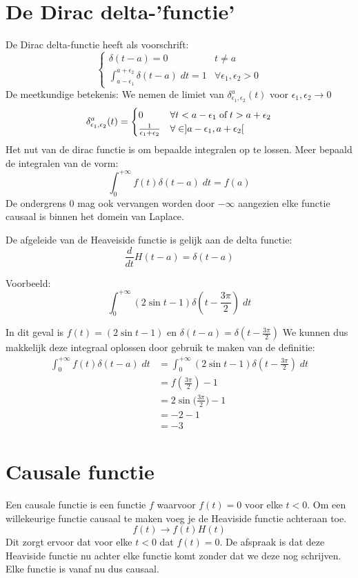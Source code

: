 \documentclass[12pt]{report}
\newcommand{\example}[2]{
      \hrulefill
      
      Voorbeeld: #1
      
      #2
      
      \hrulefill
}
\begin{document}
\section{De Dirac delta-'functie'}
De Dirac delta-functie heeft als voorschrift:
$$
  \begin{cases}
   \delta(t - a) = 0 & t \neq a \\
   \int_{a - \epsilon_1}^{a + \epsilon_2} \delta(t - a) \; dt = 1 & \forall \epsilon_1, \epsilon_2 > 0 
  \end{cases}
$$
De meetkundige betekenis: We nemen de limiet van $\delta^a_{\epsilon_1,\epsilon_2}(t)$ voor $\epsilon_1,\epsilon_2 \rightarrow 0$
$$\delta^a_{\epsilon_1,\epsilon_2}(t) = \begin{cases}
                                         0 & \forall t < a - \epsilon_1 \; \hbox{of} \; t > a + \epsilon_2 \\
                                         \frac{1}{\epsilon_1 + \epsilon_2} & \forall \in ]a - \epsilon_1, a + \epsilon_2[
                                        \end{cases}
$$
Het nut van de dirac functie is om bepaalde integralen op te lossen. Meer bepaald de integralen van de vorm:
$$\int_{0}^{+\infty} f(t) \delta(t- a)\;dt = f(a)$$
De ondergrens 0 mag ook vervangen worden door $-\infty$ aangezien elke functie causaal is binnen het domein van Laplace.

De afgeleide van de Heaveiside functie is gelijk aan de delta functie:
$$\frac{d}{dt}H(t-a) = \delta(t - a)$$
\example{$$\int_{0}^{+\infty} (2\sin t - 1) \delta(t - \frac{3\pi}{2}) \; dt$$}{
In dit geval is $f(t) = (2\sin t - 1)$ en $\delta(t - a) = \delta(t - \frac{3\pi}{2})$
We kunnen dus makkelijk deze integraal oplossen door gebruik te maken van de definitie:
\begin{equation*}
 \begin{split}
  \int_{0}^{+\infty} f(t) \delta(t- a)\;dt & = \int_{0}^{+\infty} (2\sin t - 1) \delta(t - \frac{3\pi}{2}) \; dt \\
                                           & = f(\frac{3\pi}{2}) - 1  \\
                                           & = 2\sin \bigg(\frac{3\pi}{2}\bigg) - 1 \\
                                           & = -2 - 1 \\
                                           & = - 3
 \end{split}
\end{equation*}
}
\section{Causale functie}
Een causale functie is een functie $f$ waarvoor $f(t) = 0$ voor elke $t < 0$.
Om een willekeurige functie causaal te maken voeg je de Heaviside functie achteraan toe.
$$f(t) \rightarrow f(t)H(t)$$
Dit zorgt ervoor dat voor elke $t < 0$ dat $f(t) = 0$. De afspraak is dat deze Heaviside functie nu achter elke functie komt zonder dat we deze nog schrijven. Elke functie is vanaf nu dus causaal.
\end{document}
